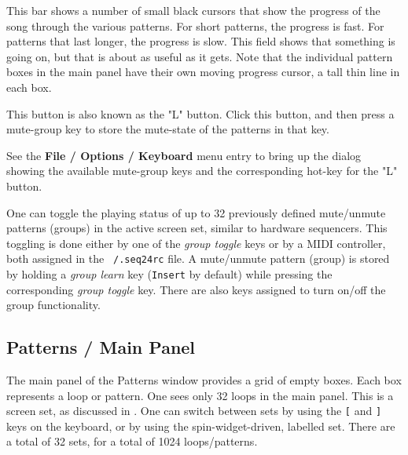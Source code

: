    \setcounter{ItemCounter}{0}      %

   This bar shows a number of small black cursors that show the progress of
   the song through the various patterns.  For short patterns, the progress
   is fast.  For patterns that last longer, the progress is slow.
   This field shows that something is going on, but that is about as useful
   as it gets.  Note that the individual pattern boxes in the main panel
   have their own moving progress cursor, a tall thin line in each box.

   This button is also known as the "L" button.
   Click this button, and then press a mute-group key
   to store the mute-state of the patterns in that key.

   See the \textbf{File / Options / Keyboard} menu entry to bring up the
   dialog showing the available mute-group keys and the corresponding
   hot-key for the "L" button.

	One can toggle the playing status of up to 32 previously 
	defined mute/unmute patterns (groups) in the active screen 
	set, similar to hardware sequencers. 
	This toggling is done either by one of the \textsl{group toggle} keys 
	or by a MIDI controller, both assigned in the
   \texttt{~/.seq24rc} file. 
	A mute/unmute pattern (group) is stored by holding a 
   \textsl{group learn} key (\texttt{Insert} by default) while pressing the
   corresponding \textsl{group toggle} key. 
	There are also keys assigned to turn on/off the group 
	functionality.

\subsection{Patterns / Main Panel}
\label{subsec:seq24_patterns_panel_main}

   The main panel of the Patterns window provides a grid of empty boxes.
   Each box represents a loop or pattern.
   One sees only 32 loops in the main panel.
   This is a screen set, as discussed in
   .
   One can switch between sets
   by using the
   \index{keys![}
   \texttt{[} and
   \index{keys!]}
   \texttt{]} keys on the keyboard, or by using
   the spin-widget-driven, labelled set.  
   There are a total of 32 sets, for a total of 
   1024 loops/patterns. 

